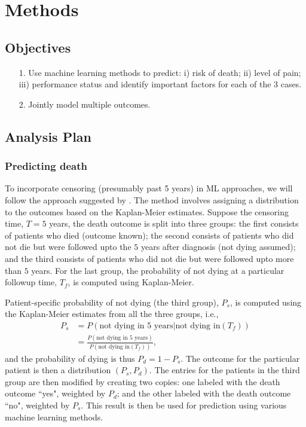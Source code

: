 \section{Methods}
\subsection{Objectives}
\begin{itemize}
\item[1.] Use machine learning methods to predict: i) risk of death; ii) level of pain; iii) performance status and identify important factors for each of the 3 cases.
\item[2.] Jointly model multiple outcomes.
\end{itemize}

\subsection{Analysis Plan}

\subsubsection{Predicting death}

To incorporate censoring (presumably past 5 years) in ML approaches, we will follow the approach suggested by \citet{zupan2000machine}. The method involves assigning a distribution to the outcomes based on the Kaplan-Meier estimates. Suppose the censoring time, $T = 5$ years, the death outcome is split into three groups: the first consists of patients who died (outcome known); the second consists of patients who did not die but were followed upto the $5$ years after diagnosis (not dying assumed); and the third consists of patients who did not die but were followed upto more than $5$ years. For the last group, the probability of not dying at a particular followup time, $T_f$, is computed using Kaplan-Meier. 

Patient-specific probability of not dying (the third group), $P_s$, is computed using the Kaplan-Meier estimates from all the three groups, i.e.,
\begin{align*}
P_s &= P(\text{not dying in 5 years}|\text{not dying in} (T_f))\\
 &= \frac{P(\text{not dying in 5 years})}{P(\text{not dying in} (T_f))},
\end{align*}
and the probability of dying is thus $P_d = 1 - P_s$. The outcome for the particular patient is then a distribution $(P_s, P_d)$. The entries for the patients in the third group are then modified by creating two copies: one labeled with the death outcome ``yes", weighted by $P_d$; and the other labeled with the death outcome ``no", weighted by $P_s$. This result is then be used for prediction using various machine learning methods.

